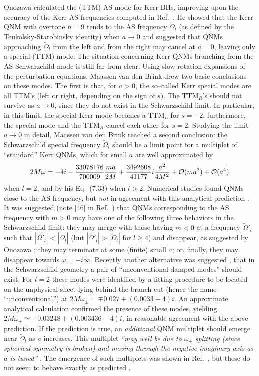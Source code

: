 \documentclass[]{iopart}
\def\be{\begin{equation}}
\def\ee{\end{equation}}
\begin{document}
Onozawa \cite{Onozawa:1996ux} calculated the (TTM) AS mode for Kerr BHs,
improving upon the accuracy of the Kerr AS frequencies computed in
Ref.~\cite{chandraspecial}. He showed that the Kerr QNM with overtone $n=9$
tends to the AS frequency $\tilde \Omega_l$ (as defined by the
Teukolsky-Starobinsky identity) when $a\to 0$ and suggested that QNMs
approaching $\tilde \Omega_l$ from the left and from the right may cancel at
$a=0$, leaving only a special (TTM) mode.
The situation concerning Kerr QNMs branching from the AS Schwarzchild mode is
still far from clear. Using slow-rotation expansions of the perturbation
equations, Maassen van den Brink \cite{MaassenvandenBrink:2000ru} drew two
basic conclusions on these modes. The first is that, for $a>0$, the so--called
Kerr special modes are all TTM's (left or right, depending on the sign of
$s$). The TTM$_R$'s should not survive as $a\to 0$, since they do not exist in
the Schwarzschild limit. In particular, in this limit, the special Kerr mode
becomes a TTM$_L$ for $s=-2$; furthermore, the special mode and the TTM$_R$
cancel each other for $s=2$. Studying the limit $a\to 0$ in detail, Maassen
van den Brink reached a second conclusion: the Schwarzschild special frequency
$\tilde \Omega_l$ should be a limit point for a multiplet of ``standard'' Kerr
QNMs, which for small $a$ are well approximated by
%
\be\label{VDBsmalla}
2M\omega=-4i -{33078176\over 700009}\frac{ma}{2M}+{3492608\over 41177}i  \frac{a^2}{4M^2}
+{\cal O}(ma^2)
+{\cal O}(a^4)
\ee
%
when $l=2$, and by his Eq.~(7.33) when $l>2$. Numerical studies found QNMs
close to the AS frequency, but {\it not} in agreement with this analytical
prediction \cite{Berti:2003jh}.
%
It was suggested (note [46] in Ref.~\cite{MaassenvandenBrink:2000ru}) that
QNMs corresponding to the AS frequency with $m>0$ may have one of the
following three behaviors in the Schwarzschild limit: they may merge with
those having $m<0$ at a frequency $\tilde \Omega'_l$ such that $|\tilde
\Omega'_l|<|\tilde \Omega_l|$ (but $|\tilde \Omega'_l|>|\tilde \Omega_l|$ for
$l\geq 4$) and disappear, as suggested by Onozawa \cite{Onozawa:1996ux}; they
may terminate at some (finite) small $a$; or, finally, they may disappear
towards $\omega=-i \infty$.  Recently another alternative was suggested
\cite{Leung:2003eq}, that in the Schwarzschild geometry a pair of
``unconventional damped modes'' should exist.  For $l=2$ these modes were
identified by a fitting procedure to be located on the unphysical sheet lying
behind the branch cut (hence the name ``unconventional'') at
$2M\omega_\pm=\mp0.027+(0.0033-4)i$. An approximate analytical calculation
confirmed the presence of these modes, yielding
$2M\omega_+\simeq-0.03248+(0.003436-4)i$, in reasonable agreement with the
above prediction.  If the prediction is true, an {\it additional} QNM
multiplet should emerge near $\tilde \Omega_l$ as $a$ increases.  This
multiplet {\it ``may well be due to $\omega_\pm$ splitting (since spherical
  symmetry is broken) and moving through the negative imaginary axis as $a$ is
  tuned''} \cite{Leung:2003eq}. The emergence of such multiplets was shown in
Ref.~\cite{Berti:2003jh}, but these do not seem to behave exactly as predicted
\cite{Leung:2003eq}.
\end{document}
